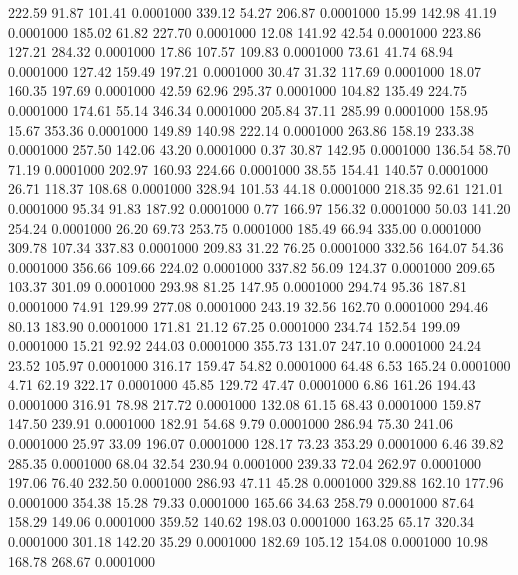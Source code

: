  222.59   91.87  101.41   0.0001000
 339.12   54.27  206.87   0.0001000
  15.99  142.98   41.19   0.0001000
 185.02   61.82  227.70   0.0001000
  12.08  141.92   42.54   0.0001000
 223.86  127.21  284.32   0.0001000
  17.86  107.57  109.83   0.0001000
  73.61   41.74   68.94   0.0001000
 127.42  159.49  197.21   0.0001000
  30.47   31.32  117.69   0.0001000
  18.07  160.35  197.69   0.0001000
  42.59   62.96  295.37   0.0001000
 104.82  135.49  224.75   0.0001000
 174.61   55.14  346.34   0.0001000
 205.84   37.11  285.99   0.0001000
 158.95   15.67  353.36   0.0001000
 149.89  140.98  222.14   0.0001000
 263.86  158.19  233.38   0.0001000
 257.50  142.06   43.20   0.0001000
   0.37   30.87  142.95   0.0001000
 136.54   58.70   71.19   0.0001000
 202.97  160.93  224.66   0.0001000
  38.55  154.41  140.57   0.0001000
  26.71  118.37  108.68   0.0001000
 328.94  101.53   44.18   0.0001000
 218.35   92.61  121.01   0.0001000
  95.34   91.83  187.92   0.0001000
   0.77  166.97  156.32   0.0001000
  50.03  141.20  254.24   0.0001000
  26.20   69.73  253.75   0.0001000
 185.49   66.94  335.00   0.0001000
 309.78  107.34  337.83   0.0001000
 209.83   31.22   76.25   0.0001000
 332.56  164.07   54.36   0.0001000
 356.66  109.66  224.02   0.0001000
 337.82   56.09  124.37   0.0001000
 209.65  103.37  301.09   0.0001000
 293.98   81.25  147.95   0.0001000
 294.74   95.36  187.81   0.0001000
  74.91  129.99  277.08   0.0001000
 243.19   32.56  162.70   0.0001000
 294.46   80.13  183.90   0.0001000
 171.81   21.12   67.25   0.0001000
 234.74  152.54  199.09   0.0001000
  15.21   92.92  244.03   0.0001000
 355.73  131.07  247.10   0.0001000
  24.24   23.52  105.97   0.0001000
 316.17  159.47   54.82   0.0001000
  64.48    6.53  165.24   0.0001000
   4.71   62.19  322.17   0.0001000
  45.85  129.72   47.47   0.0001000
   6.86  161.26  194.43   0.0001000
 316.91   78.98  217.72   0.0001000
 132.08   61.15   68.43   0.0001000
 159.87  147.50  239.91   0.0001000
 182.91   54.68    9.79   0.0001000
 286.94   75.30  241.06   0.0001000
  25.97   33.09  196.07   0.0001000
 128.17   73.23  353.29   0.0001000
   6.46   39.82  285.35   0.0001000
  68.04   32.54  230.94   0.0001000
 239.33   72.04  262.97   0.0001000
 197.06   76.40  232.50   0.0001000
 286.93   47.11   45.28   0.0001000
 329.88  162.10  177.96   0.0001000
 354.38   15.28   79.33   0.0001000
 165.66   34.63  258.79   0.0001000
  87.64  158.29  149.06   0.0001000
 359.52  140.62  198.03   0.0001000
 163.25   65.17  320.34   0.0001000
 301.18  142.20   35.29   0.0001000
 182.69  105.12  154.08   0.0001000
  10.98  168.78  268.67   0.0001000
